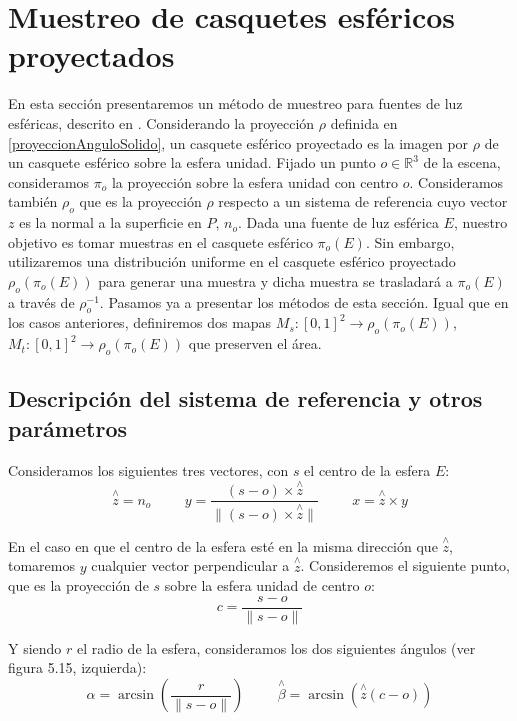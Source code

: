 \section{Muestreo de casquetes esféricos proyectados}

En esta sección presentaremos un método de muestreo para fuentes de luz esféricas, descrito en \cite{Urena2018}. Considerando la proyección $\rho$ definida en \ref{proyeccionAnguloSolido}, un casquete esférico proyectado es la imagen por $\rho$ de un casquete esférico sobre la esfera unidad. Fijado un punto $o\in\mathds{R}^3$ de la escena, consideramos $\pi_o$ la proyección sobre la esfera unidad con centro $o$. Consideramos también $\rho_o$ que es la proyección $\rho$ respecto a un sistema de referencia cuyo vector $z$ es la normal a la superficie en $P$, $n_o$. Dada una fuente de luz esférica $E$, nuestro objetivo es tomar muestras en el casquete esférico $\pi_o(E)$. Sin embargo, utilizaremos una distribución uniforme en el casquete esférico proyectado $\rho_o(\pi_o(E))$ para generar una muestra y dicha muestra se trasladará a $\pi_o(E)$ a través de $\rho_o^{-1}$. Pasamos ya a presentar los métodos de esta sección. Igual que en los casos anteriores, definiremos dos mapas $M_s:[0,1]^2\rightarrow \rho_o(\pi_o(E))$, $M_t:[0,1]^2\rightarrow \rho_o(\pi_o(E))$ que preserven el área. 

\subsection{Descripción del sistema de referencia y otros parámetros}
Consideramos los siguientes tres vectores, con $s$ el centro de la esfera $E$:
$$\overset{\wedge}{z} = n_o\hspace{1cm} y= \frac{(s-o)\times \overset{\wedge}{z}}{\|(s-o)\times \overset{\wedge}{z}\|} \hspace{1cm} x=\overset{\wedge}{z}\times y$$

En el caso en que el centro de la esfera esté en la misma dirección que $\overset{\wedge}{z}$, tomaremos $y$ cualquier vector perpendicular a $\overset{\wedge}{z}$. Consideremos el siguiente punto, que es la proyección de $s$ sobre la esfera unidad de centro $o$:
$$c=\frac{s-o}{\|s-o\|}$$

Y siendo $r$ el radio de la esfera, consideramos los dos siguientes ángulos (ver figura 5.15, izquierda):
$$\alpha = \arcsin(\frac{r}{\|s-o\|}) \hspace{1cm} \overset{\wedge}{\beta}=\arcsin(\overset{\wedge}{z}(c-o))$$


